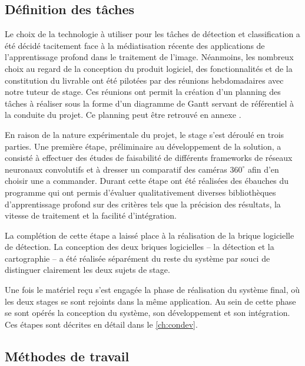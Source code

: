 		\subsection{Définition des tâches}
			
			Le choix de la technologie à utiliser pour les tâches de détection et classification a été décidé tacitement face à la médiatisation récente des applications de l'apprentissage profond dans le traitement de l'image. Néanmoins, les nombreux choix au regard de la conception du produit logiciel, des fonctionnalités et de la constitution du livrable ont été pilotées par des réunions hebdomadaires avec notre tuteur de stage. Ces réunions ont permit la création d'un planning des tâches à réaliser sous la forme d'un diagramme de Gantt servant de référentiel à la conduite du projet. Ce planning peut être retrouvé en annexe \todoref.
			\par
			En raison de la nature expérimentale du projet, le stage s'est déroulé en trois parties. Une première étape, préliminaire au développement de la solution, a consisté à effectuer des études de faisabilité de différents frameworks de réseaux neuronaux convolutifs et à dresser un comparatif des caméras $ 360^{\circ} $ afin d'en choisir une a commander. Durant cette étape ont été réalisées des ébauches du programme qui ont permis d'évaluer qualitativement diverses bibliothèques d'apprentissage profond sur des critères tels que la précision des résultats, la vitesse de traitement et la facilité d'intégration.
			\par
			La complétion de cette étape a laissé place à la réalisation de la brique logicielle de détection. La conception des deux briques logicielles -- la détection et la cartographie -- a été réalisée séparément du reste du système par souci de distinguer clairement les deux sujets de stage.
			\par
			Une fois le matériel reçu s'est engagée la phase de réalisation du système final, où les deux stages se sont rejoints dans la même application. Au sein de cette phase se sont opérés la conception du système, son développement et son intégration. Ces étapes sont décrites en détail dans le \autoref{ch:condev}.
			
			
		\subsection{Méthodes de travail}

